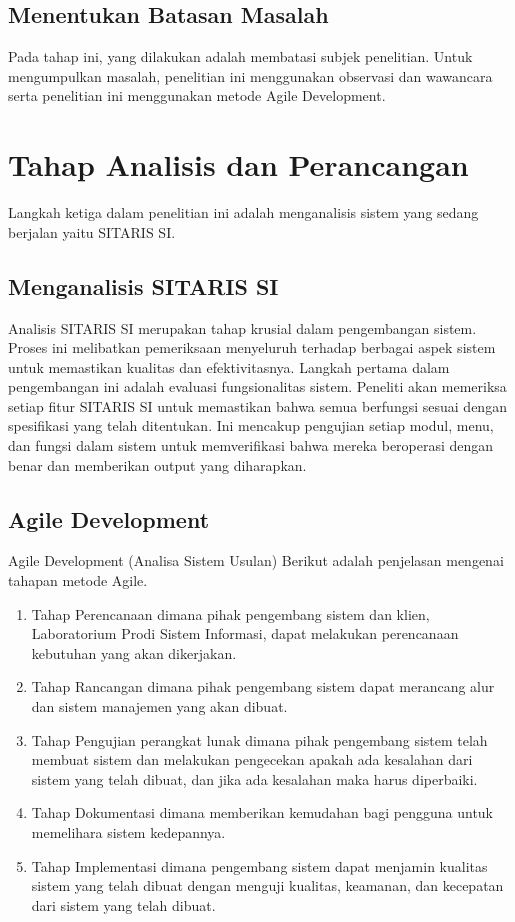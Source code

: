 \subsection{Menentukan Batasan Masalah}
Pada tahap ini, yang dilakukan adalah membatasi subjek penelitian. Untuk mengumpulkan masalah, penelitian ini menggunakan observasi dan wawancara serta penelitian ini menggunakan metode Agile Development.

\section{Tahap Analisis dan Perancangan}
Langkah ketiga dalam penelitian ini adalah menganalisis sistem yang sedang berjalan yaitu SITARIS SI.

\subsection{Menganalisis SITARIS SI}
Analisis SITARIS SI merupakan tahap krusial dalam pengembangan sistem. Proses ini melibatkan pemeriksaan menyeluruh terhadap berbagai aspek sistem untuk memastikan kualitas dan efektivitasnya. Langkah pertama dalam pengembangan ini adalah evaluasi fungsionalitas sistem. Peneliti akan memeriksa setiap fitur SITARIS SI untuk memastikan bahwa semua berfungsi sesuai dengan spesifikasi yang telah ditentukan. Ini mencakup pengujian setiap modul, menu, dan fungsi dalam sistem untuk memverifikasi bahwa mereka beroperasi dengan benar dan memberikan output yang diharapkan.

\subsection{Agile Development}
Agile Development (Analisa Sistem Usulan) Berikut adalah penjelasan mengenai tahapan metode Agile.
\begin{enumerate}
	\item Tahap Perencanaan dimana pihak pengembang sistem dan klien, Laboratorium Prodi Sistem Informasi, dapat melakukan perencanaan kebutuhan yang akan dikerjakan.
	\item Tahap Rancangan dimana pihak pengembang sistem dapat merancang alur dan sistem manajemen yang akan dibuat.
	\item Tahap Pengujian perangkat lunak dimana pihak pengembang sistem telah membuat sistem dan melakukan pengecekan apakah ada kesalahan dari sistem yang telah dibuat, dan jika ada kesalahan maka harus diperbaiki.
	\item Tahap Dokumentasi dimana memberikan kemudahan bagi pengguna untuk memelihara sistem kedepannya.
	\item Tahap Implementasi dimana pengembang sistem dapat menjamin kualitas sistem yang telah dibuat dengan menguji kualitas, keamanan, dan kecepatan dari sistem yang telah dibuat.
\end{enumerate}

